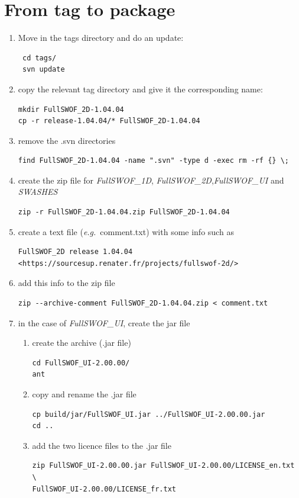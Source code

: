 \documentclass[a4paper, 11pt]{article}
\newcommand{\FullSWOFoneD}{\emph{FullSWOF\_1D}}
\newcommand{\FullSWOFtwoD}{\emph{FullSWOF\_2D}}
\newcommand{\FullSWOFUI}{\emph{FullSWOF\_UI}}
\newcommand{\SWASHES}{\emph{SWASHES}}
\begin{document}
\section{From tag to package}

\begin{enumerate}
\item Move in the tags directory and do an update:
\begin{verbatim}
 cd tags/
 svn update
\end{verbatim}
\item copy the relevant tag directory and give it the corresponding name:
\begin{verbatim}
mkdir FullSWOF_2D-1.04.04
cp -r release-1.04.04/* FullSWOF_2D-1.04.04
\end{verbatim}
\item remove the .svn directories
\begin{verbatim}
find FullSWOF_2D-1.04.04 -name ".svn" -type d -exec rm -rf {} \;
\end{verbatim}

\item create the zip file for \FullSWOFoneD, \FullSWOFtwoD{},\FullSWOFUI{} and \SWASHES{}
\begin{verbatim}
zip -r FullSWOF_2D-1.04.04.zip FullSWOF_2D-1.04.04
\end{verbatim}
\item create a text file (\emph{e.g.}~comment.txt) with some info such as 
\begin{verbatim}
FullSWOF_2D release 1.04.04
<https://sourcesup.renater.fr/projects/fullswof-2d/>
\end{verbatim}
\item add this info to the zip file
\begin{verbatim}
zip --archive-comment FullSWOF_2D-1.04.04.zip < comment.txt
\end{verbatim}

\color[gray]{0.4}
\item in the case of \FullSWOFUI{}, create the jar file 

\begin{enumerate}
\item create the archive (.jar file)
\begin{verbatim}
cd FullSWOF_UI-2.00.00/
ant
\end{verbatim}
\item copy and rename the .jar file
\begin{verbatim}
cp build/jar/FullSWOF_UI.jar ../FullSWOF_UI-2.00.00.jar
cd ..
\end{verbatim}
\item add the two licence files to the .jar file
\begin{verbatim}
zip FullSWOF_UI-2.00.00.jar FullSWOF_UI-2.00.00/LICENSE_en.txt \
FullSWOF_UI-2.00.00/LICENSE_fr.txt
\end{verbatim}


\end{enumerate}
\end{enumerate}
\end{document}
